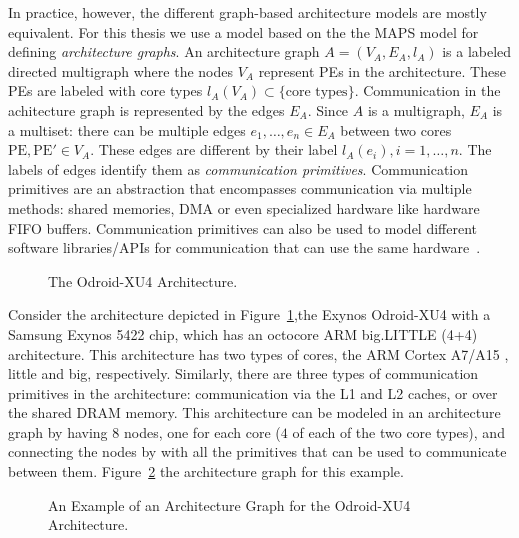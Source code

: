 In practice, however, the different graph-based architecture models are mostly equivalent.
For this thesis we use a model based on the the MAPS model for defining \emph{architecture graphs}.
An architecture graph $A = (V_A,E_A,l_A)$ is a labeled directed multigraph where the nodes $V_A$ represent \acp{PE} in the architecture. These \acp{PE} are labeled with core types $l_A(V_A) \subset \{\text{core types}\}$. 
Communication in the achitecture graph is represented by the edges $E_A$. Since $A$ is a multigraph, $E_A$ is a multiset: there can be multiple edges $e_1,\ldots,e_n \in E_A$ between two cores $\text{PE},\text{PE}' \in V_A$.
These edges are different by their label $l_A(e_i), i = 1,\ldots,n$. The labels of edges identify them as \emph{communication primitives}.
Communication primitives are an abstraction that encompasses communication via multiple methods: shared memories, \ac{DMA} or even specialized hardware like hardware \ac{FIFO} buffers.
Communication primitives can also be used to model different software libraries/\acp{API} for communication that can use the same hardware~\cite{odendahl2013split}.

\begin{figure}[h]
	\centering
\resizebox{0.3\textwidth}{!}{
   \begin{tikzpicture}
     
   \end{tikzpicture}
 }
   \caption{The Odroid-XU4 Architecture.}
   \label{fig:odroid}
\end{figure}

Consider the architecture depicted in Figure~\ref{fig:odroid},the Exynos Odroid-XU4 with a Samsung Exynos 5422 chip, which has an octocore ARM big.LITTLE (4+4) architecture. 
This architecture has two types of cores, the ARM Cortex A7/A15 , little and  big, respectively. Similarly, there are three types of communication primitives in the architecture:
communication via the L1 and L2 caches, or over the shared DRAM memory.
This architecture can be modeled in an architecture graph by having $8$ nodes, one for each core ($4$ of each of the two core types), and connecting the nodes by with all the primitives that can be used to communicate between them.
Figure~\ref{fig:architecture_graph_odroid} the architecture graph for this example.

\begin{figure}[h]
	\centering
\resizebox{0.8\textwidth}{!}{
   \begin{tikzpicture}
     
   \end{tikzpicture}
 }
   \caption{An Example of an Architecture Graph for the Odroid-XU4 Architecture.}
   \label{fig:architecture_graph_odroid}
\end{figure}

